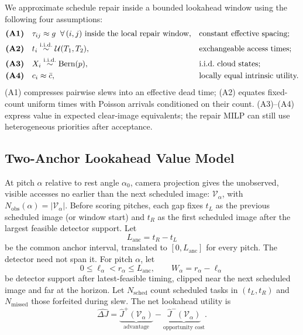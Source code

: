 We approximate schedule repair inside a bounded lookahead window using the following four assumptions:
\begin{align}
&\textbf{(A1)}\quad \tau_{ij} \approx g \;\;\forall\,(i,j)\ \text{inside the local repair window}, && \text{constant effective spacing;} \notag\\
&\textbf{(A2)}\quad t_i \overset{\mathrm{i.i.d.}}{\sim} \mathcal{U}(T_1, T_2), && \text{exchangeable access times;} \notag\\
&\textbf{(A3)}\quad X_i \overset{\mathrm{i.i.d.}}{\sim} \mathrm{Bern}(p), && \text{i.i.d.\ cloud states;} \notag\\
&\textbf{(A4)}\quad c_i \approx \bar{c}, && \text{locally equal intrinsic utility.}
\label{eq:assumptions}
\end{align}
(A1) compresses pairwise slews into an effective dead time; (A2) equates fixed-count uniform times with Poisson arrivals conditioned on their count. (A3)--(A4) express value in expected clear-image equivalents; the repair MILP can still use heterogeneous priorities after acceptance.

\subsection{Two-Anchor Lookahead Value Model}
\label{sec:heuristic}

At pitch $\alpha$ relative to rest angle $\alpha_0$, camera projection gives the unobserved, visible accesses no earlier than the next scheduled image: $\mathcal{V}_\alpha$, with $N_{\mathrm{obs}}(\alpha)=|\mathcal{V}_\alpha|$. Before scoring pitches, each gap fixes $t_L$ as the previous scheduled image (or window start) and $t_R$ as the first scheduled image after the largest feasible detector support.
Let
\begin{equation}
L_{\mathrm{anc}} = t_R - t_L
\label{eq:anchor_span}
\end{equation}
be the common anchor interval, translated to $[0,L_{\mathrm{anc}}]$ for every pitch. The detector need not span it.
For pitch $\alpha$, let
\begin{equation}
0 \leq \ell_\alpha < r_\alpha \leq L_{\mathrm{anc}},
\qquad
W_\alpha = r_\alpha-\ell_\alpha
\label{eq:detector_support}
\end{equation}
be detector support after latest-feasible timing, clipped near the next scheduled image and far at the horizon. Let $N_{\mathrm{sched}}$ count scheduled tasks in $(t_L,t_R)$ and $N_{\mathrm{missed}}$ those forfeited during slew.
The net lookahead utility is
\begin{equation}
\widehat{\Delta J} = \underbrace{\hat{J}^+(\mathcal{V}_\alpha)}_{\text{advantage}} - \underbrace{\hat{J}^-(\mathcal{V}_\alpha)}_{\text{opportunity cost}}.
\label{eq:net_advantage}
\end{equation}

